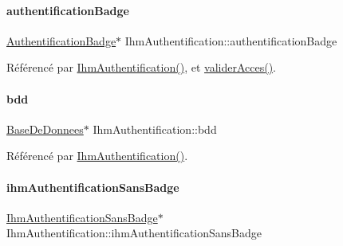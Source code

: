 \mbox{\label{class_ihm_authentification_ac257a02215ec8d5d31e5a1def0c0e86d}} 
\paragraph{\texorpdfstring{authentification\+Badge}{authentificationBadge}}
{\footnotesize\ttfamily \hyperlink{class_authentification_badge}{Authentification\+Badge}$\ast$ Ihm\+Authentification\+::authentification\+Badge\hspace{0.3cm}{\ttfamily [private]}}



Référencé par \hyperlink{class_ihm_authentification_a09e60cbdf8d1377e17d940463acb75ba}{Ihm\+Authentification()}, et \hyperlink{class_ihm_authentification_ad62f646310fff597d3bf50af2c3d5d0c}{valider\+Acces()}.

\mbox{\label{class_ihm_authentification_ac87969204d55c2ab399498d4248172c0}} 
\paragraph{\texorpdfstring{bdd}{bdd}}
{\footnotesize\ttfamily \hyperlink{class_base_de_donnees}{Base\+De\+Donnees}$\ast$ Ihm\+Authentification\+::bdd\hspace{0.3cm}{\ttfamily [private]}}



Référencé par \hyperlink{class_ihm_authentification_a09e60cbdf8d1377e17d940463acb75ba}{Ihm\+Authentification()}.

\mbox{\label{class_ihm_authentification_a9444198403beeaf7386488d56f8ad7f2}} 
\paragraph{\texorpdfstring{ihm\+Authentification\+Sans\+Badge}{ihmAuthentificationSansBadge}}
{\footnotesize\ttfamily \hyperlink{class_ihm_authentification_sans_badge}{Ihm\+Authentification\+Sans\+Badge}$\ast$ Ihm\+Authentification\+::ihm\+Authentification\+Sans\+Badge\hspace{0.3cm}{\ttfamily [private]}}



